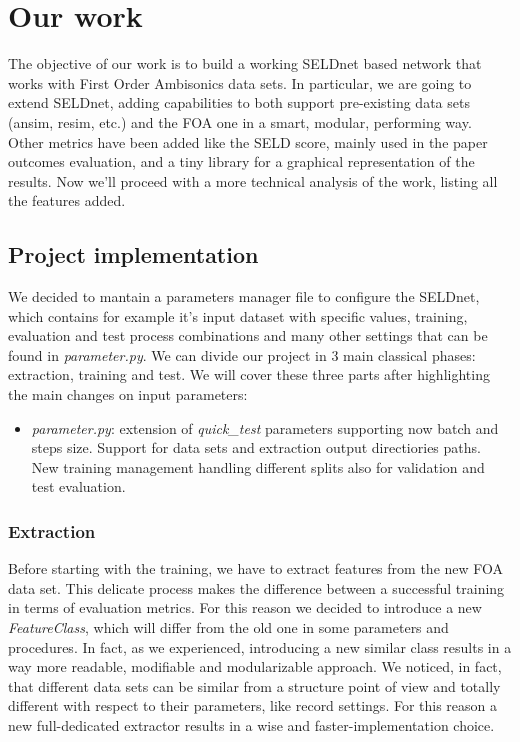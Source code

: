 \documentclass[11pt]{article}
\begin{document}
\newpage
\section{Our work}

The objective of our work is to build a working SELDnet based network that works with First Order Ambisonics data sets. In particular, we are going to extend SELDnet, adding capabilities to both support pre-existing data sets (ansim, resim, etc.) and the FOA one in a smart, modular, performing way. Other metrics have been added like the SELD score, mainly used in the paper \cite{paper2019} outcomes evaluation, and a tiny library for a graphical representation of the results. Now we'll proceed with a more technical analysis of the work, listing all the features added.

\subsection{Project implementation}
We decided to mantain a parameters manager file to configure the SELDnet, which contains for example it's input dataset with specific values, training, evaluation and test process combinations and many other settings that can be found in \textit{parameter.py}. We can divide our project in 3 main classical phases: extraction, training and test. We will cover these three parts after highlighting the main changes on input parameters:

\begin{itemize}
\item \textit{parameter.py}: extension of \textit{quick\_test} parameters supporting now batch and steps size. Support for data sets and extraction output directiories paths. New training management handling different splits also for validation and test evaluation.
\end{itemize}

\subsubsection{Extraction}

Before starting with the training, we have to extract features from the new FOA data set. This delicate process makes the difference between a successful training in terms of evaluation metrics. For this reason we decided to introduce a new \textit{FeatureClass}, which will differ from the old one in some parameters and procedures. In fact, as we experienced, introducing a new similar class results in a way more readable, modifiable and modularizable approach. We noticed, in fact, that different data sets can be similar from a structure point of view and totally different with respect to their parameters, like record settings. For this reason a new full-dedicated extractor results in a wise and faster-implementation choice.
\end{document}

